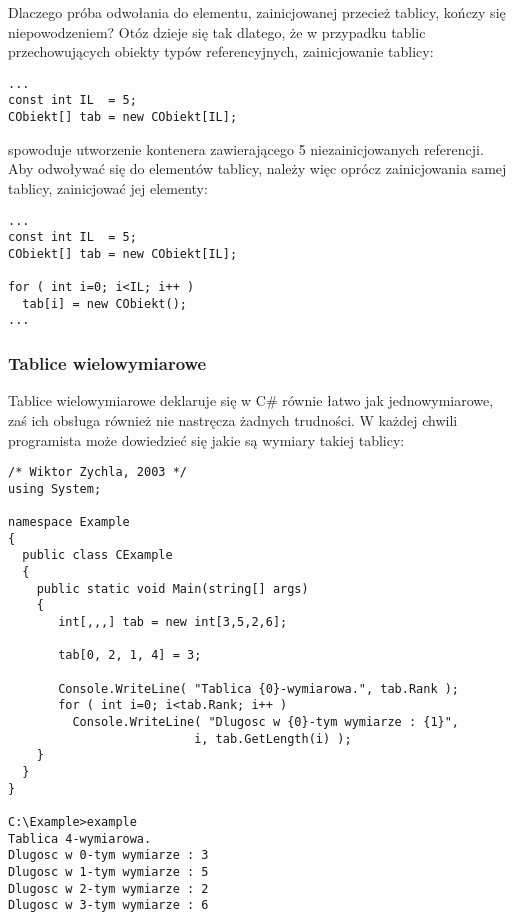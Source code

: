 Dlaczego próba odwołania do elementu, zainicjowanej przecież tablicy, kończy się niepowodzeniem?
Otóz dzieje się tak dlatego, że w przypadku tablic przechowujących obiekty typów referencyjnych, 
zainicjowanie tablicy:

\begin{scriptsize}
\begin{verbatim}
...
const int IL  = 5;
CObiekt[] tab = new CObiekt[IL];
\end{verbatim}
\end{scriptsize}

spowoduje utworzenie kontenera zawierającego 5 niezainicjowanych referencji. Aby odwoływać się do
elementów tablicy, należy więc oprócz zainicjowania samej tablicy, zainicjować jej elementy:

\begin{scriptsize}
\begin{verbatim}
...
const int IL  = 5;
CObiekt[] tab = new CObiekt[IL];

for ( int i=0; i<IL; i++ )
  tab[i] = new CObiekt();
...
\end{verbatim}
\end{scriptsize}

\subsubsection{Tablice wielowymiarowe}

Tablice wielowymiarowe deklaruje się w C\# równie łatwo jak jednowymiarowe, zaś ich 
obsługa również nie nastręcza żadnych trudności. W każdej chwili programista może dowiedzieć się
jakie są wymiary takiej tablicy:

\begin{scriptsize}
\begin{verbatim}
/* Wiktor Zychla, 2003 */
using System;

namespace Example
{
  public class CExample 
  {
    public static void Main(string[] args)
    {
       int[,,,] tab = new int[3,5,2,6];

       tab[0, 2, 1, 4] = 3;

       Console.WriteLine( "Tablica {0}-wymiarowa.", tab.Rank );
       for ( int i=0; i<tab.Rank; i++ )
         Console.WriteLine( "Dlugosc w {0}-tym wymiarze : {1}", 
	                      i, tab.GetLength(i) );
    }
  }
}

C:\Example>example
Tablica 4-wymiarowa.
Dlugosc w 0-tym wymiarze : 3
Dlugosc w 1-tym wymiarze : 5
Dlugosc w 2-tym wymiarze : 2
Dlugosc w 3-tym wymiarze : 6
\end{verbatim}
\end{scriptsize}

